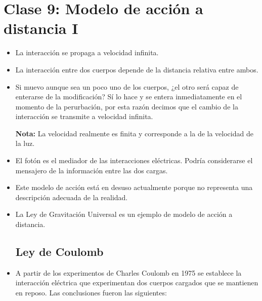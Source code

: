 \documentclass[a4paper,10pt]{article}
\begin{document}
\renewcommand{\labelitemi}{\ding{226}}


\section*{Clase 9: Modelo de acci\'on a distancia I}

\begin{itemize}

\subsection*{Modelos de acción a distancia}

\item La interacci\'on se propaga a velocidad infinita.

\item La interacción entre dos cuerpos depende de la distancia relativa entre ambos.

\item Si muevo aunque sea un poco uno de los cuerpos, ¿el otro ser\'a capaz de enterarse
de la modificaci\'on? S\'i lo hace y se entera inmediatamente en el momento de la perurbaci\'on,
por esta razón decimos que el cambio de la interacci\'on se transmite a velocidad infinita.

\textbf{Nota:} La velocidad realmente es finita y corresponde a la de la velocidad de la luz.

\item El fot\'on es el mediador de las interacciones el\'ectricas. Podr\'ia considerarse el
mensajero de la informaci\'on entre las dos cargas.

\item Este modelo de acci\'on est\'a en desuso actualmente porque no representa una
descripci\'on adecuada de la realidad.

\item La Ley de Gravitaci\'on Universal es un ejemplo de modelo de acci\'on a distancia.

\subsection*{Ley de Coulomb}

\item A partir de los experimentos de Charles Coulomb en 1975 se establece la interacci\'on
el\'ectrica que experimentan dos cuerpos cargados que se mantienen en reposo. Las conclusiones
fueron las siguientes:


\end{itemize}
\end{document}
